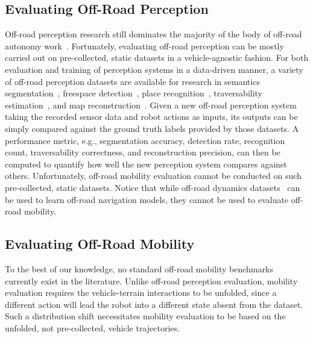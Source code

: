 \subsection{Evaluating Off-Road Perception}
Off-road perception research still dominates the majority of the body of off-road autonomy work~\cite{xiao2022motion}. Fortunately, evaluating off-road perception can be mostly carried out on pre-collected, static datasets in a vehicle-agnostic fashion. 
For both evaluation and training of perception systems in a data-driven manner, a variety of off-road perception datasets are available for research in semantics segmentation~\cite{wigness2019rugd, jiang2021rellis, mortimer2024goose}, freespace detection~\cite{min2022orfd}, place recognition~\cite{knights2023wild}, traversability estimation~\cite{sharma2022cat}, and map reconstruction~\cite{liu2024botanicgarden}. Given a new off-road perception system taking the recorded sensor data and robot actions as inputs, its outputs can be simply compared against the ground truth labels provided by those datasets. A performance metric, e.g., segmentation accuracy, detection rate, recognition count, traversability correctness, and reconstruction precision, can then be computed to quantify how well the new perception system compares against others. Unfortunately, off-road mobility evaluation cannot be conducted on such pre-collected, static datasets. Notice that while off-road dynamics datasets~\cite{triest2022tartandrive} can be used to learn off-road navigation models, they cannot be used to evaluate off-road mobility.  


\subsection{Evaluating Off-Road Mobility}
To the best of our knowledge, no standard off-road mobility benchmarks currently exist in the literature. 
Unlike off-road perception evaluation, mobility evaluation requires the vehicle-terrain interactions to be unfolded, since a different action will lead the robot into a different state absent from the dataset. Such a distribution shift necessitates mobility evaluation to be based on the unfolded, not pre-collected, vehicle trajectories.


